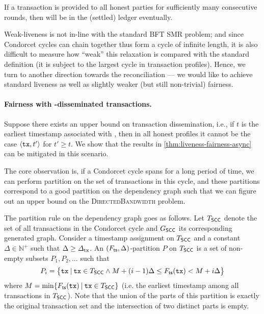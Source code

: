 \begin{definition}
    If a transaction \tx is provided to all honest parties for sufficiently many consecutive rounds, then \tx will be in the (settled) ledger eventually.
\end{definition}

Weak-liveness is not in-line with the standard BFT SMR problem; and since Condorcet cycles can chain together thus form a cycle of infinite length, it is also difficult to measure how ``weak'' this relaxation is compared with the standard definition (it is subject to the largest cycle in transaction profiles).
%
Hence, we turn to another direction towards the reconciliation --- we would like to achieve standard liveness as well as slightly weaker (but still non-trivial) fairness.

\paragraph{Fairness with \txDelay-disseminated transactions.}
%
Suppose there exists an upper bound \txDelay on transaction dissemination, i.e., if $t$ is the earliest timestamp associated with \tx, then in all honest profiles it cannot be the case $\langle \mathtt{tx}, t' \rangle$ for $t' \ge t$.
%
We show that the results in \cref{thm:liveness-fairness-async} can be mitigated in this scenario.

The core observation is, if a Condorcet cycle spans for a long period of time, we can perform partition on the set of transactions in this cycle, and these partitions correspond to a good partition on the dependency graph such that we can figure out an upper bound on the \textsc{DirectedBandwidth} problem.

The partition rule on the dependency graph goes as follows.
%
Let $T_\mathsf{SCC}$ denote the set of all transactions in the Condorcet cycle and $G_\mathsf{SCC}$ its corresponding generated graph.
%
Consider a timestamp assignment \mapTimestamp on $T_\mathsf{SCC}$ and a constant $\Delta \in \mathbb{N}^+$ such that $\Delta \ge \varDelta_{\mathrm{tx}}$.
%
An $(F_{\mathsf{ts}}, \Delta)$-partition $P$ on $T_\mathsf{SCC}$ is a set of non-empty subsets  $P_1,  P_2, \ldots$ such that
%
\[ P_i = \big\{\mathtt{tx} \mathbin| \mathtt{tx} \in T_\mathsf{SCC} \wedge M + (i - 1) \Delta \le F_{\mathsf{ts}}(\mathtt{tx}) < M + i \Delta  \big\} \]
%
where $M = \min \{F_{\mathsf{ts}}(\mathtt{tx}) \mathbin| \mathtt{tx} \in T_\mathsf{SCC}\}$ (i.e. the earliest timestamp among all transactions in $T_\mathsf{SCC}$).
%
Note that the union of the parts of this partition is exactly the original transaction set and the intersection of two distinct parts is empty.


